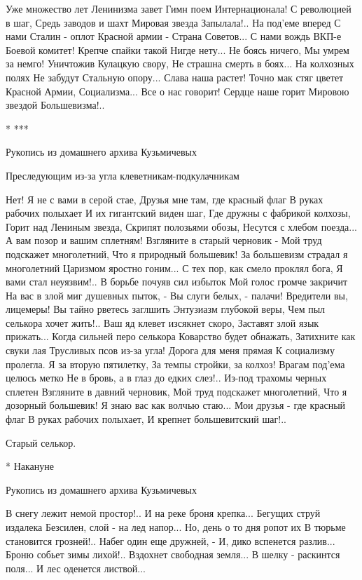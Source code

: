 Уже множество лет
Ленинизма завет
    Гимн поем
    Интернационала!
С революцией в шаг,
Средь заводов и шахт
    Мировая звезда
    Запылала!..
На под'еме вперед
С нами Сталин - оплот
    Красной армии -
    Страна Советов...
С нами вождь ВКП-е
Боевой комитет!
    Крепче спайки такой
    Нигде нету...
Не боясь ничего,
Мы умрем за немго!
    Уничтожив
    Кулацкую свору,
Не страшна смерть в боях...
На колхозных полях
    Не забудут
    Стальную опору...
Слава наша растет!
Точно мак стяг цветет
    Красной Армии,
    Социализма...
Все о нас говорит!
Сердце наше горит
    Мировою звездой
    Большевизма!..


* ***

Рукопись из домашнего архива Кузьмичевых

    Преследующим из-за угла
    клеветникам-подкулачникам

Нет! Я не с вами в серой стае,
    Друзья мне там, где красный флаг
В руках рабочих полыхает
    И их гигантский виден шаг,
Где дружны с фабрикой колхозы,
    Горит над Лениным звезда,
Скрипят полозьями обозы,
    Несутся с хлебом поезда...
А вам позор и вашим сплетням!
    Взгляните в старый черновик -
Мой труд подскажет многолетний,
    Что я природный большевик!
За большевизм страдал я многолетний
    Царизмом яростно гоним...
С тех пор, как смело проклял бога,
    Я вами стал неуязвим!..
В борьбе почуяв сил избыток
    Мой голос громче закричит
На вас в злой миг душевных пыток, -
    Вы слуги белых, - палачи!
Вредители вы, лицемеры!
    Вы тайно рветесь заглшить
Энтузиазм глубокой веры,
    Чем пыл селькора хочет жить!..
Ваш яд клевет изсякнет скоро,
    Заставят злой язык прижать...
Когда сильней перо селькора
    Коварство будет обнажать,
Затихните как свуки лая
    Трусливых псов из-за угла!
Дорога для меня прямая
    К социализму пролегла.
Я за вторую пятилетку,
    За темпы стройки, за колхоз!
Врагам под'ема целюсь метко
    Не в бровь, а в глаз до едких слез!..
Из-под трахомы черных сплетен
    Взгляните в давний черновик,
Мой труд подскажет многолетний,
    Что я дозорный большевик!
Я знаю вас как волчью стаю...
    Мои друзья - где красный флаг
В руках рабочих полыхает,
    И крепнет большевитский шаг!..

    Старый селькор.

* Накануне

Рукопись из домашнего архива Кузьмичевых

В снегу лежит немой простор!..
    И на реке броня крепка...
    Бегущих струй издалека
Безсилен, слой - на лед напор...
Но, день о то дня ропот их
    В тюрьме становится грозней!..
    Набег один еще дружней, -
И, дико вспенется разлив...
Броню собьет зимы лихой!..
    Вздохнет свободная земля...
    В шелку - раскинтся поля...
И лес оденется листвой...


